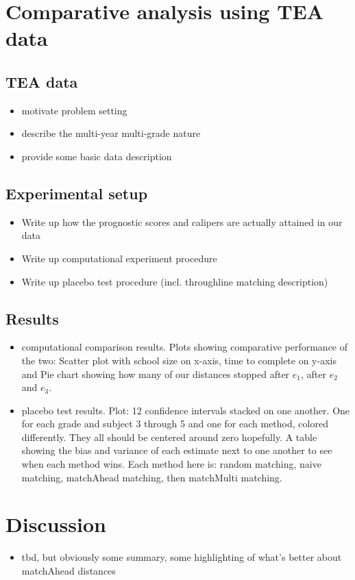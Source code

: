 \documentclass[aoas]{imsart}
\theoremstyle{plain}
\theoremstyle{definition}
\begin{document}
\section{Comparative analysis using TEA data}

\subsection{TEA data}

\begin{itemize}
  \item motivate problem setting
  \item describe the multi-year multi-grade nature
  \item provide some basic data description
\end{itemize}

\subsection{Experimental setup}

\begin{itemize}
  \item Write up how the prognostic scores and calipers are actually attained in our data
  \item Write up computational experiment procedure
  \item Write up placebo test procedure (incl. throughline matching description)
\end{itemize}

\subsection{Results}

\begin{itemize}
  \item computational comparison results. Plots showing comparative performance of the two: Scatter plot with school size on x-axis, time to complete on y-axis and Pie chart showing how many of our distances stopped after $e_1$, after $e_2$ and $e_3$.
  \item placebo test results. Plot: 12 confidence intervals stacked on one another. One for each grade and subject 3 through 5 and one for each method, colored differently. They all should be centered around zero hopefully. A table showing the bias and variance of each estimate next to one another to see when each method wins. Each method here is: random matching, naive matching, matchAhead matching, then matchMulti matching.
\end{itemize}

\section{Discussion}

\begin{itemize}
  \item tbd, but obviously some summary, some highlighting of what's better about matchAhead distances
\end{itemize}
\end{document}
